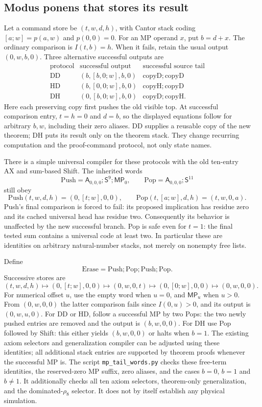 \subsection{Modus ponens that stores its result}
Let a command store be $(t,w,d,h)$, with Cantor stack coding
$[a;w]=p(a,w)$ and $p(0,0)=0$. For an MP operand $x$, put $b=d+x$.
The ordinary comparison is $I(t,b)=h$. When it fails, retain the usual
output $(0,w,b,0)$. Three alternative successful outputs are
\[
\begin{array}{c|c|l}
\text{protocol}&\text{successful output}&\text{successful source tail}\\\hline
\mathrm{DD}&(b,[b,0;w],b,0)&\mathrm{copyD};\mathrm{copyD}\\
\mathrm{HD}&(b,[0,0;w],b,0)&\mathrm{copyH};\mathrm{copyD}\\
\mathrm{DH}&(0,[b,0;w],b,0)&\mathrm{copyD};\mathrm{copyH}.
\end{array}
\]
Here each preserving copy first pushes the old visible top. At successful
comparison entry, $t=h=0$ and $d=b$, so the displayed equations follow
for arbitrary $b,w$, including their zero aliases. DD supplies a reusable
copy of the new theorem; DH puts its result only on the theorem stack.
They change recurring computation and the proof-command protocol, not
only state names.

There is a simple universal compiler for these protocols with the old
ten-entry AX and sum-based Shift. The inherited words
\[
 \mathrm{Push}=\mathsf A_{0,0,0};\mathsf S^9;\mathsf{MP}_0,
 \qquad
 \mathrm{Pop}=\mathsf A_{0,0,0};\mathsf S^{11}
\]
still obey
\[
\mathrm{Push}(t,w,d,h)=(0,[t;w],0,0),\qquad
\mathrm{Pop}(t,[a;w],d,h)=(t,w,0,a).
\]
Push's final comparison is forced to fail: its proposed implication
has residue zero and its cached universal head has residue two.
Consequently its behavior is unaffected by the new successful branch.
Pop is safe even for $t=1$: the final tested sum contains a universal
code at least two. In particular these are identities on arbitrary
natural-number stacks, not merely on nonempty free lists.

Define
\[
 \mathrm{Erase}=\mathrm{Push};\mathrm{Pop};\mathrm{Push};\mathrm{Pop}.
\]
Successive stores are
\[
(t,w,d,h)\mapsto(0,[t;w],0,0)\mapsto(0,w,0,t)
 \mapsto(0,[0;w],0,0)\mapsto(0,w,0,0).
\]
For numerical offset $u$, use the empty word when $u=0$, and
$\mathsf{MP}_u$ when $u>0$. From $(0,w,0,0)$ the latter comparison
fails since $I(0,u)>0$, and its output is $(0,w,u,0)$.
For DD or HD, follow a successful MP by two Pops: the two newly
pushed entries are removed and the output is $(b,w,0,0)$.
For DH use Pop followed by Shift: this either yields $(b,w,0,0)$ or
halts when $b=1$. The existing axiom selectors and generalization
compiler can be adjusted using these identities; all additional stack
entries are supported by theorem proofs whenever the successful MP is.
The script \texttt{mp\_tail\_words.py} checks these free-term identities,
the reserved-zero MP suffix, zero aliases, and the cases $b=0$, $b=1$
and $b\ne1$. It additionally checks all ten axiom selectors,
theorem-only generalization, and the dominated-$\rho_8$ selector.
It does not by itself establish any physical simulation.

